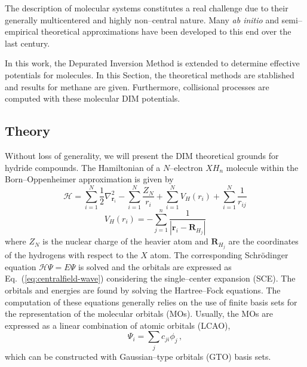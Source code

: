 \documentclass[10pt]{article}
\begin{document}
The description of molecular systems constitutes a real challenge due 
to their generally multicentered and highly non--central nature. 
Many \textit{ab initio} and semi--empirical theoretical approximations 
have been developed to this end over the last century.

In this work, the Depurated Inversion Method is extended to determine 
effective potentials for molecules. In this Section, the theoretical 
methods are stablished and results for methane are given. Furthermore, 
collisional processes are computed with these molecular DIM potentials.

\subsection{Theory}

Without loss of generality, we will present the DIM theoretical grounds 
for hydride compounds. The Hamiltonian of a $N$--electron $X\!H_n$ 
molecule within the Born--Oppenheimer approximation is given by
\begin{equation}
 \mathcal{H}=\sum_{i=1}^N \frac{1}{2} \nabla^2_{\mathbf{r}_i} 
 - \sum_{i=1}^N \frac{Z_N}{r_i} 
 + \sum_{i=1}^N V_H(r_i)
 + \sum_{i=1}^N \frac{1}{r_{ij}}
\end{equation}
\begin{equation}
 V_H(r_i) = -\sum_{j=1}^{n} \frac{1}{\left|\mathbf{r}_i-\mathbf{R}_{H_j}\right|}
\end{equation}
where $Z_N$ is the nuclear charge of the heavier atom and 
$\mathbf{R}_{H_j}$ are the coordinates of the hydrogens with respect to 
the $X$ atom. The corresponding Schr\"odinger equation 
$\mathcal{H}\Psi=E\Psi$ is solved and the orbitals are expressed as
Eq.~(\ref{eq:centralfield-wave})
considering the single--center 
expansion (SCE). The orbitals and energies are found by solving the 
Hartree--Fock equations. The computation of these 
equations generally relies on the use of finite basis sets for the 
representation of the molecular orbitals (MOs). Usually, the MOs are 
expressed as a linear combination of atomic orbitals (LCAO),
\begin{equation}
 \Psi_i=\sum_j c_{ji} \phi_j\,,
\end{equation}
which can be constructed with Gaussian--type orbitals (GTO) basis 
sets. 
\end{document}
